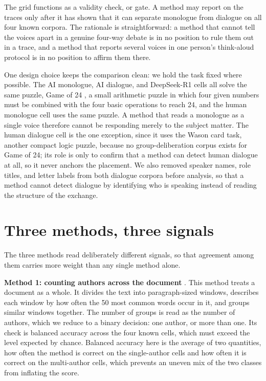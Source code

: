 \documentclass[10pt,twocolumn]{article}
\begin{document}
The grid functions as a validity check, or gate. A method may report on the traces only after it has
shown that it can separate monologue from dialogue on all four known corpora. The rationale is
straightforward: a method that cannot tell the voices apart in a genuine four-way debate is in no
position to rule them out in a trace, and a method that reports several voices in one person's
think-aloud protocol is in no position to affirm them there.

One design choice keeps the comparison clean: we hold the task fixed where possible. The AI
monologue, AI dialogue, and DeepSeek-R1 cells all solve the same puzzle, Game of 24 \cite{yao2023}, a
small arithmetic puzzle in which four given numbers must be combined with the four basic operations to
reach 24, and the human monologue cell uses the same puzzle. A method that reads a monologue as a
single voice therefore cannot be responding merely to the subject matter. The human dialogue cell is
the one exception, since it uses the Wason card task, another compact logic puzzle, because no
group-deliberation corpus exists for Game of 24; its role is only to confirm that a method can detect
human dialogue at all, so it never anchors the placement. We also removed speaker names, role titles,
and letter labels from both dialogue corpora before analysis, so that a method cannot detect dialogue
by identifying who is speaking instead of reading the structure of the exchange.

\section{Three methods, three signals}
The three methods read deliberately different signals, so that agreement among them carries more
weight than any single method alone.

\textbf{Method 1: counting authors across the document} \cite{nath2019}. This method treats a
document as a whole. It divides the text into paragraph-sized windows, describes each window by how
often the 50 most common words occur in it, and groups similar windows together. The number of groups
is read as the number of authors, which we reduce to a binary decision: one author, or more than one.
Its check is balanced accuracy across the four known cells, which must exceed the level expected by
chance. Balanced accuracy here is the average of two quantities, how often the method is correct on
the single-author cells and how often it is correct on the multi-author cells, which prevents an
uneven mix of the two classes from inflating the score.
\end{document}
